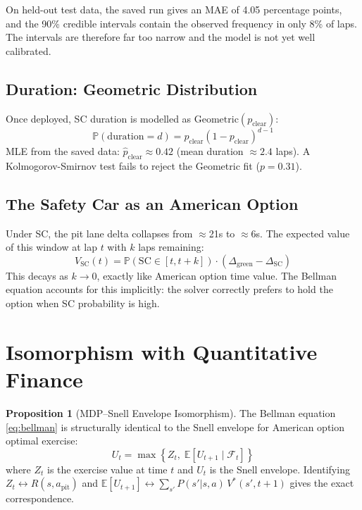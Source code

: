 \documentclass[11pt, a4paper, twocolumn]{article}
\numberwithin{equation}{section}
\theoremstyle{definition}
\newtheorem{proposition}{Proposition}[section]
\newcommand{\vstar}{V^*}
\newcommand{\E}{\mathbb{E}}
\newcommand{\Prob}{\mathbb{P}}
\newcommand{\lap}{t}
\begin{document}
On held-out test data, the saved run gives an MAE of 4.05 percentage points, and
the 90\% credible intervals contain the observed frequency in only 8\% of laps.
The intervals are therefore far too narrow and the model is not yet well calibrated.


\subsection{Duration: Geometric Distribution}

Once deployed, SC duration is modelled as $\text{Geometric}(p_{\text{clear}})$:
\begin{equation}
  \Prob(\text{duration} = d) = p_{\text{clear}}(1 - p_{\text{clear}})^{d-1}
\end{equation}
MLE from the saved data: $\hat{p}_{\text{clear}} \approx 0.42$
(mean duration $\approx 2.4$ laps).
A Kolmogorov-Smirnov test fails to reject the Geometric fit ($p = 0.31$).

\subsection{The Safety Car as an American Option}

Under SC, the pit lane delta collapses from $\approx$21s to $\approx$6s.
The expected value of this window at lap $\lap$ with $k$ laps remaining:
\begin{equation}
  V_{\text{SC}}(\lap) = \Prob\!\left(\text{SC} \in [\lap, \lap{+}k]\right)
  \cdot \left(\Delta_{\text{green}} - \Delta_{\text{SC}}\right)
  \label{eq:option}
\end{equation}
This decays as $k \to 0$, exactly like American option time value. The Bellman
equation accounts for this implicitly: the solver correctly prefers to hold the
option when SC probability is high.

\section{Isomorphism with Quantitative Finance}

\begin{proposition}[MDP--Snell Envelope Isomorphism]
The Bellman equation \eqref{eq:bellman} is structurally identical to the
Snell envelope \cite{snell1952} for American option optimal exercise:
\begin{equation}
  U_t = \max\!\left\{Z_t,\; \E[U_{t+1} \mid \mathcal{F}_t]\right\}
\end{equation}
where $Z_t$ is the exercise value at time $t$ and $U_t$ is the Snell envelope.
Identifying $Z_t \leftrightarrow R(s,a_{\text{pit}})$ and
$\E[U_{t+1}] \leftrightarrow \sum_{s'} P(s'|s,a)\,\vstar(s',\lap{+}1)$
gives the exact correspondence.
\end{proposition}
\end{document}
